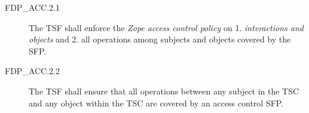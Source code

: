 \documentclass[12pt,english]{scrbook}
\begin{document}



\begin{description}

  \item[FDP{\_}ACC.2.1 ] The TSF shall enforce the \emph{Zope access control
    policy} on 1. \emph{interactions and objects} and 2. all operations among
    subjects and objects covered by the SFP.

  \item[FDP{\_}ACC.2.2] The TSF shall ensure that all operations between any
    subject in the TSC and any object within the TSC are covered by an access
    control SFP.

\end{description}


\end{document}
